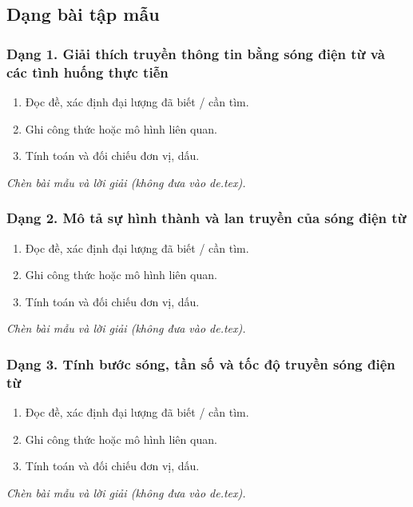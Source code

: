 

\subsection{Dạng bài tập mẫu}
\subsubsection{Dạng 1. Giải thích truyền thông tin bằng sóng điện từ và các tình huống thực tiễn}
\begin{phuongphap}
\begin{enumerate}
\item Đọc đề, xác định đại lượng đã biết / cần tìm.
\item Ghi công thức hoặc mô hình liên quan.
\item Tính toán và đối chiếu đơn vị, dấu.
\end{enumerate}
\end{phuongphap}
\begin{vidumau}
\textit{Chèn bài mẫu và lời giải (không đưa vào de.tex).}
\end{vidumau}

\subsubsection{Dạng 2. Mô tả sự hình thành và lan truyền của sóng điện từ}
\begin{phuongphap}
\begin{enumerate}
\item Đọc đề, xác định đại lượng đã biết / cần tìm.
\item Ghi công thức hoặc mô hình liên quan.
\item Tính toán và đối chiếu đơn vị, dấu.
\end{enumerate}
\end{phuongphap}
\begin{vidumau}
\textit{Chèn bài mẫu và lời giải (không đưa vào de.tex).}
\end{vidumau}

\subsubsection{Dạng 3. Tính bước sóng, tần số và tốc độ truyền sóng điện từ}
\begin{phuongphap}
\begin{enumerate}
\item Đọc đề, xác định đại lượng đã biết / cần tìm.
\item Ghi công thức hoặc mô hình liên quan.
\item Tính toán và đối chiếu đơn vị, dấu.
\end{enumerate}
\end{phuongphap}
\begin{vidumau}
\textit{Chèn bài mẫu và lời giải (không đưa vào de.tex).}
\end{vidumau}

